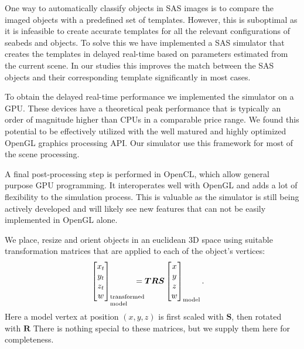 \documentclass[12pt,journal,draftclsnofoot,onecolumn]{IEEEtran}
\newcommand\bmat[1]{\begin{bmatrix}#1\end{bmatrix}}
\newcommand\mat[1]{\boldsymbol{#1}}
\newcommand\1{\vec 1}
\newcommand*\R{\mat R}
\begin{document}
One way to automatically classify objects in SAS images is to compare the imaged objects with a predefined set of templates. However, this is suboptimal as it is infeasible to create accurate templates for all the relevant configurations of seabeds and objects. To solve this we have implemented a SAS simulator that creates the templates in delayed real-time based on parameters estimated from the current scene. In our studies this improves the match between the SAS objects and their corresponding template significantly in most cases.

To obtain the delayed real-time performance we implemented the simulator on a GPU. These devices have a theoretical peak performance that is typically an order of magnitude higher than CPUs in a comparable price range. We found this potential to be effectively utilized with the well matured and highly optimized OpenGL graphics processing API. Our simulator use this framework for most of the scene processing.

A final post-processing step is performed in OpenCL, which allow general purpose GPU programming. It interoperates well with OpenGL and adds a lot of flexibility to the simulation process. This is valuable as the simulator is still being actively developed and will likely see new features that can not be easily implemented in OpenGL alone.

\appendix

We place, resize and orient objects in an euclidean 3D space using suitable transformation matrices that are applied to each of the object's vertices:
\begin{align}
\bmat{x_t \\ y_t \\ z_t \\ w}_\text{\parbox{1cm}{\setlength\baselineskip{0.3cm}transformed\\model}} &= \boldsymbol{T}\R\boldsymbol{S} \bmat{x \\ y \\ z \\ w}_\text{model}.
\end{align}
Here a model vertex at position $(x,y,z)$ is first scaled with $\boldsymbol{S}$, then rotated with $\R$
There is nothing special to these matrices, but we supply them here for completeness.
\end{document}
